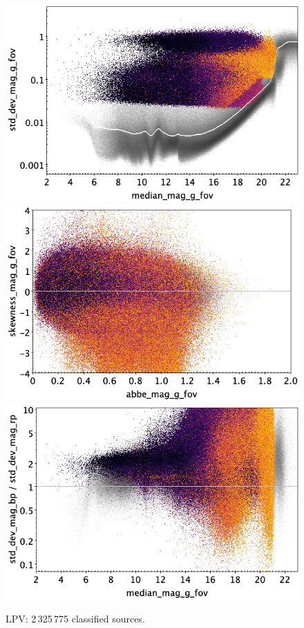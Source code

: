 \documentclass[longauth]{aa}
\begin{document}
\begin{appendix}
\begin{figure}
\hspace{2mm}
 \includegraphics[width=0.45\hsize]{figures/appendix/LPV_cls_msd.png} \\ %
\vspace{4mm}
 \includegraphics[width=0.45\hsize]{figures/appendix/LPV_cls_ask.png}  %
\hspace{2mm}
 \includegraphics[width=0.45\hsize]{figures/appendix/LPV_cls_msdr.png}  \\ %
\vspace{4mm}
 \caption{LPV: 2\,325\,775 classified sources.}  
 \label{fig:app:LPV}
\end{figure}


\end{appendix}
\end{document}
